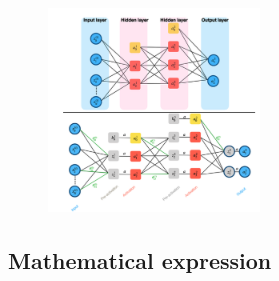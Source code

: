 \documentclass[a4paper,10pt]{article}
\begin{document}
\begin{figure}[ht]
    \centering
    \includegraphics[width =0.5\textwidth]{FNN.png}
\end{figure}

\subsection{Mathematical expression}
\end{document}
